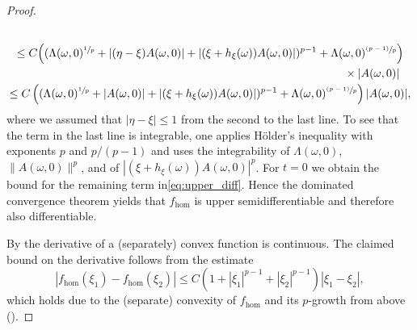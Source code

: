 \documentclass[10pt]{amsart}
\newcommand{\psfrac}[2]{\sfrac{(#1)}{#2}}
\theoremstyle{definition}
\let\w\omega
\begin{document}
\begin{proof}
\begin{multline*}
\\
\leq C \Bigl((\Lambda(\w,0)^{\sfrac{1}{p}}+|(\eta-\xi)A(\w,0)|+|(\xi+h_{\xi}(\w))A(\w,0)|)^{p-1}+\Lambda(\w,0)^{\psfrac{p-1}{p}}\Bigr)\\
\shoveright{{}\times|A(\w,0)|}
\\
\leq C \left((\Lambda(\w,0)^{\sfrac{1}{p}}+|A(\w,0)|+|(\xi+h_{\xi}(\w))A(\w,0)|)^{p-1}+\Lambda(\w,0)^{\psfrac{p-1}{p}}\right)|A(\w,0)|,
\end{multline*}
where we assumed that $|\eta-\xi|\leq 1$ from the second to the last line.
To see that the term in the last line is integrable, one applies Hölder's inequality with exponents $p$ and $p/(p-1)$ and uses the integrability of $\Lambda(\w,0)$, $\|A(\w,0)\|^p$, and of $|(\xi+h_{\xi}(\w))A(\w,0)|^p$. For $t=0$ we obtain the bound for the remaining term in\eqref{eq:upper_diff}. Hence the dominated convergence theorem yields that $f_{\hom}$ is upper semidifferentiable and therefore also differentiable.

By \cite[Th.\,4.65]{FoLe} the derivative of a (separately) convex function is continuous. The claimed bound on the derivative follows from the estimate
\begin{equation*}
|f_{\hom}(\xi_1)-f_{\hom}(\xi_2)|\leq C(1+|\xi_1|^{p-1}+|\xi_2|^{p-1})|\xi_1-\xi_2|,
\end{equation*}
which holds due to the (separate) convexity of $f_{\hom}$ and its $p$-growth from above (\cf \cite[Prop.\,4.64]{FoLe}).
\end{proof}
\end{document}
